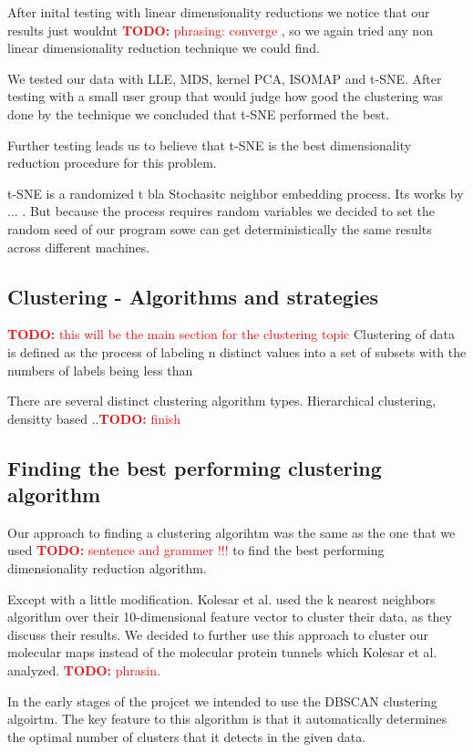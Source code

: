 \documentclass[journal]{vgtc}       %
\newcommand{\todo}[1]{\textcolor{red}{\textbf{TODO:} #1}}
\begin{document}
After inital testing with linear dimensionality reductions we notice that our results just wouldnt \todo{phrasing: converge }, so we again tried any non linear dimensionality reduction technique we could find.

We tested our data with LLE, MDS, kernel PCA, ISOMAP and t-SNE.
After testing with a small user group that would judge how good the clustering was done by the technique we concluded that t-SNE performed the best.

Further testing leads us to believe that t-SNE is the best dimensionality reduction procedure for this problem.

t-SNE is a randomized t bla Stochasitc neighbor embedding process. Its works by ... . But because the process requires random variables we decided to set the random seed of our program sowe can get deterministically the same results across different machines.

\subsection{Clustering - Algorithms and strategies }
\todo{this will be the main section for the clustering topic }
Clustering of data is defined as the process of labeling n distinct values into a set of subsets with the numbers of labels being less than 

There are several distinct clustering algorithm types. Hierarchical clustering, densitty based ..\todo{finish}


\subsection{Finding the best performing clustering algorithm}
Our approach to finding a clustering algorihtm was the same as the one that we used \todo{sentence and grammer  !!! } to find the best performing dimensionality reduction algorithm.

Except with a little modification. Kolesar et al. \cite{kolesar} used the k nearest neighbors algorithm over their 10-dimensional feature vector to cluster their data, as they discuss their results. We decided to further use this approach to cluster our molecular maps instead of the molecular protein tunnels which Kolesar et al. analyzed. \todo{phrasin}.


In the early stages of the projcet we intended to use the DBSCAN clustering algoirtm. 
The key feature to this algorithm is that it automatically determines the optimal number of clusters that it detects in the given data. 
\end{document}
